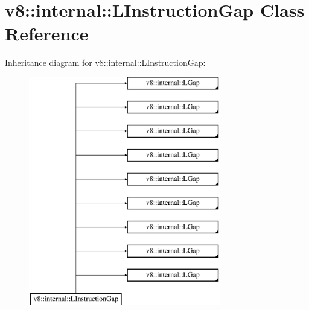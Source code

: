 \hypertarget{classv8_1_1internal_1_1_l_instruction_gap}{}\section{v8\+:\+:internal\+:\+:L\+Instruction\+Gap Class Reference}
\label{classv8_1_1internal_1_1_l_instruction_gap}
Inheritance diagram for v8\+:\+:internal\+:\+:L\+Instruction\+Gap\+:\begin{figure}[H]
\begin{center}
\leavevmode
\includegraphics[height=10.000000cm]{classv8_1_1internal_1_1_l_instruction_gap}
\end{center}
\end{figure}
